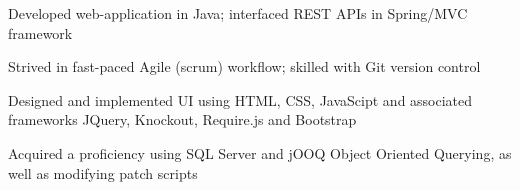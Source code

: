\documentclass[letterpaper]{deedy-resume} %
\begin{document}
\begin{minipage}[t]{0.66\textwidth}
\vspace{10pt}
\begin{tightitemize}
\vspace{-9pt}
\item Developed web-application in Java; interfaced REST APIs  in Spring/MVC framework 
 
\item Strived in fast-paced Agile (scrum) workflow; skilled with Git version control 

\item Designed and implemented UI using HTML, CSS, JavaScipt and associated frameworks JQuery, Knockout, Require.js and Bootstrap 



\item Acquired a proficiency using SQL Server and jOOQ Object Oriented Querying, as well as modifying patch scripts














\end{tightitemize}
\end{minipage}
\end{document}
